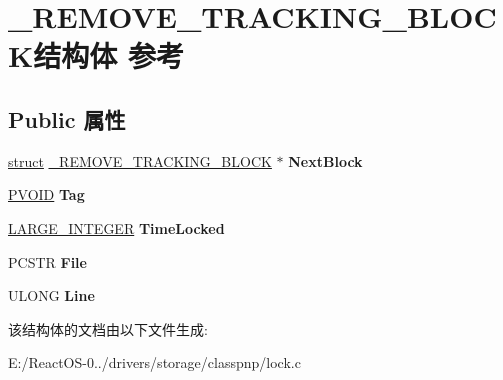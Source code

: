 \hypertarget{struct___r_e_m_o_v_e___t_r_a_c_k_i_n_g___b_l_o_c_k}{}\section{\+\_\+\+R\+E\+M\+O\+V\+E\+\_\+\+T\+R\+A\+C\+K\+I\+N\+G\+\_\+\+B\+L\+O\+C\+K结构体 参考}
\label{struct___r_e_m_o_v_e___t_r_a_c_k_i_n_g___b_l_o_c_k}
\subsection*{Public 属性}
\begin{DoxyCompactItemize}
\item 
\mbox{\label{struct___r_e_m_o_v_e___t_r_a_c_k_i_n_g___b_l_o_c_k_a53ffd3b9fa1156890909581746be9821}} 
\hyperlink{interfacestruct}{struct} \hyperlink{struct___r_e_m_o_v_e___t_r_a_c_k_i_n_g___b_l_o_c_k}{\+\_\+\+R\+E\+M\+O\+V\+E\+\_\+\+T\+R\+A\+C\+K\+I\+N\+G\+\_\+\+B\+L\+O\+CK} $\ast$ {\bfseries Next\+Block}
\item 
\mbox{\label{struct___r_e_m_o_v_e___t_r_a_c_k_i_n_g___b_l_o_c_k_a08229cda905aae4e46543080abc1c873}} 
\hyperlink{interfacevoid}{P\+V\+O\+ID} {\bfseries Tag}
\item 
\mbox{\label{struct___r_e_m_o_v_e___t_r_a_c_k_i_n_g___b_l_o_c_k_a695560774b66c001d11bec86b96f5514}} 
\hyperlink{union___l_a_r_g_e___i_n_t_e_g_e_r}{L\+A\+R\+G\+E\+\_\+\+I\+N\+T\+E\+G\+ER} {\bfseries Time\+Locked}
\item 
\mbox{\label{struct___r_e_m_o_v_e___t_r_a_c_k_i_n_g___b_l_o_c_k_ad39488d350e1c3ac28f0d91603e1fe42}} 
P\+C\+S\+TR {\bfseries File}
\item 
\mbox{\label{struct___r_e_m_o_v_e___t_r_a_c_k_i_n_g___b_l_o_c_k_ad9705a24f2fdffc2cb19dcf815ae52ea}} 
U\+L\+O\+NG {\bfseries Line}
\end{DoxyCompactItemize}


该结构体的文档由以下文件生成\+:\begin{DoxyCompactItemize}
\item 
E\+:/\+React\+O\+S-\/0../drivers/storage/classpnp/lock.\+c\end{DoxyCompactItemize}
